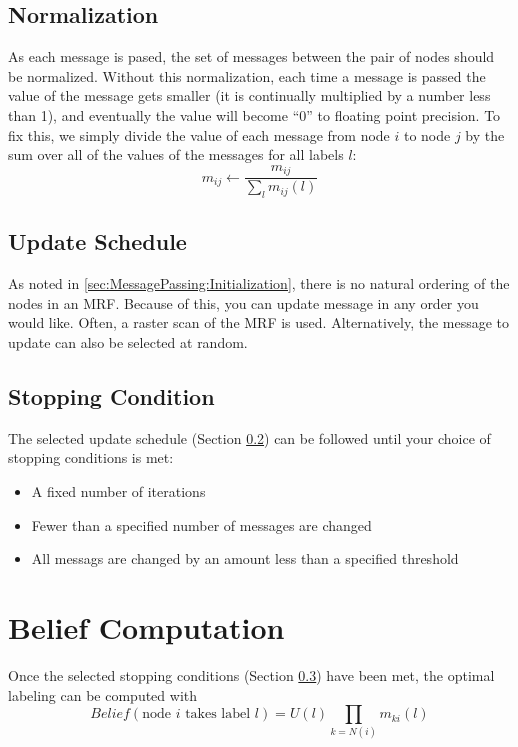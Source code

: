 \documentclass[a4paper,10pt]{article}
\begin{document}
\subsection{Normalization}
As each message is pased, the set of messages between the pair of nodes should be normalized. Without this normalization, each time a message is passed the value of the message gets smaller (it is continually multiplied by a number less than 1), and eventually the value will become ``$0$'' to floating point precision. To fix this, we simply divide the value of each message from node $i$ to node $j$ by the sum over all of the values of the messages for all labels $l$:
\begin{equation}
m_{ij} \leftarrow \frac{m_{ij}}{\sum_{l}m_{ij}(l)}
\end{equation}


\subsection{Update Schedule}
\label{sec:UpdateSchedule}
As noted in \ref{sec:MessagePassing:Initialization}, there is no natural ordering of the nodes in an MRF. Because of this, you can update message in any order you would like. Often, a raster scan of the MRF is used. Alternatively, the message to update can also be selected at random.

\subsection{Stopping Condition}
\label{sec:StoppingConditions}
The selected update schedule (Section \ref{sec:UpdateSchedule}) can be followed until your choice of stopping conditions is met:
\begin{itemize}
 \item A fixed number of iterations
 \item Fewer than a specified number of messages are changed
 \item All messags are changed by an amount less than a specified threshold
\end{itemize}


\section{Belief Computation}
Once the selected stopping conditions (Section \ref{sec:StoppingConditions}) have been met, the optimal labeling can be computed with
\begin{equation}
 Belief(\mbox{node } i \mbox{ takes label } l) = U(l) \prod _{k = N(i)} m_{ki} (l)
\end{equation}
\end{document}

